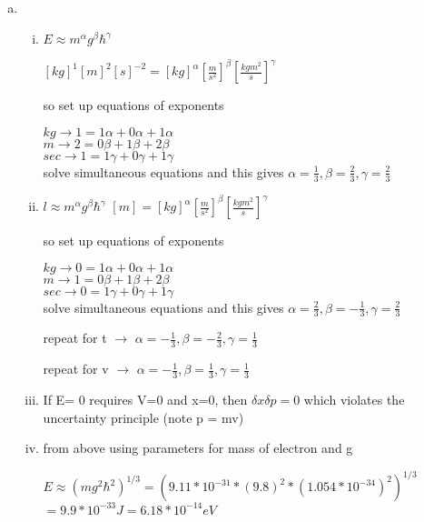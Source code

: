 \documentclass[ps1.tex]{subfiles}
\begin{document}
\begin{enumerate}[(a)]
\item \mbox{} \\ 
\noindent
\begin{enumerate}[i.]
\item $E \approx m^{\alpha}g^{\beta}\hbar^{\gamma}$

$[kg]^1[m]^2[s]^{-2} = [kg]^{\alpha}[\frac {m}{s^2}]^{\beta}[\frac {kgm^2}{s}]^{\gamma}$

so set up equations of exponents

$kg  \rightarrow 1 = 1\alpha + 0\alpha + 1\alpha$\\
$m  \rightarrow 2 = 0\beta + 1\beta + 2\beta$\\
$sec  \rightarrow 1 = 1\gamma + 0\gamma + 1\gamma$\\

solve simultaneous equations and this gives 
$\alpha = \frac {1}{3}, \beta = \frac {2}{3}, \gamma = \frac {2}{3}$

\item $l \approx m^{\alpha}g^{\beta}\hbar^{\gamma}$
$[m] = [kg]^{\alpha}[\frac {m}{s^2}]^{\beta}[\frac {kgm^2}{s}]^{\gamma}$

so set up equations of exponents

$kg  \rightarrow 0 = 1\alpha + 0\alpha + 1\alpha$\\
$m  \rightarrow 1 = 0\beta + 1\beta + 2\beta$\\
$sec  \rightarrow 0 = 1\gamma + 0\gamma + 1\gamma$\\

solve simultaneous equations and this gives 
$\alpha = \frac {2}{3}, \beta = -\frac {1}{3}, \gamma = \frac {2}{3}$

repeat for t $\rightarrow$
$\alpha = -\frac {1}{3}, \beta = -\frac {2}{3}, \gamma = \frac {1}{3}$

repeat for v $\rightarrow$
$\alpha = -\frac {1}{3}, \beta = \frac {1}{3}, \gamma = \frac {1}{3}$\\

\item If E= 0 requires V=0 and x=0, then $\delta x \delta p = 0$ which violates the uncertainty principle (note p = mv)

\item from above using parameters for mass of electron and g
\begin{center}
$E \approx (mg^2\hbar^2)^{1/3} = (9.11*10^{-31}*(9.8)^2*(1.054*10^{-34})^2)^{1/3}$
$ =  9.9*10^{-33} J = 6.18*10^{-14}eV$
\end{center}


\end{enumerate}
\end{enumerate}
\end{document}
